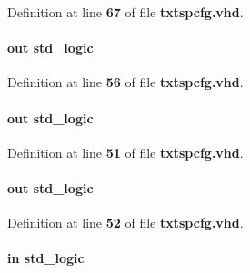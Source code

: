 Definition at line {\bf 67} of file {\bf txtspcfg.\+vhd}.

\paragraph[{pll\+\_\+areset}]{ {\bfseries \textcolor{keywordflow}{out}\textcolor{vhdlchar}{ }} {\bfseries \textcolor{comment}{std\+\_\+logic}\textcolor{vhdlchar}{ }} \hspace{0.3cm}{\ttfamily [Port]}}\label{classtxtspcfg_a26690b026911a6743ab6414cd74a02b4}


Definition at line {\bf 56} of file {\bf txtspcfg.\+vhd}.

\paragraph[{ps\+\_\+en\+\_\+0}]{ {\bfseries \textcolor{keywordflow}{out}\textcolor{vhdlchar}{ }} {\bfseries \textcolor{comment}{std\+\_\+logic}\textcolor{vhdlchar}{ }} \hspace{0.3cm}{\ttfamily [Port]}}\label{classtxtspcfg_a1bda508452a3ebbcef7341c2edc18d77}


Definition at line {\bf 51} of file {\bf txtspcfg.\+vhd}.

\paragraph[{ps\+\_\+en\+\_\+1}]{ {\bfseries \textcolor{keywordflow}{out}\textcolor{vhdlchar}{ }} {\bfseries \textcolor{comment}{std\+\_\+logic}\textcolor{vhdlchar}{ }} \hspace{0.3cm}{\ttfamily [Port]}}\label{classtxtspcfg_aafb211f99dbebe0a12040deb9015c2af}


Definition at line {\bf 52} of file {\bf txtspcfg.\+vhd}.

\paragraph[{sclk}]{ {\bfseries \textcolor{keywordflow}{in}\textcolor{vhdlchar}{ }} {\bfseries \textcolor{comment}{std\+\_\+logic}\textcolor{vhdlchar}{ }} \hspace{0.3cm}{\ttfamily [Port]}}\label{classtxtspcfg_ac922a2fc6a86b71aca5c7d49ea3bc36b}


